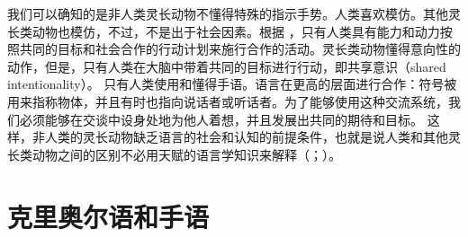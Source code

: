 我们可以确知的是非人类灵长动物不懂得特殊的指示手势。人类喜欢模仿。其他灵长类动物也模仿，不过，不是出于社会因素\citep[--10]{Tomasello2006c}。根据 \citet[]{TCCBM2005a}，只有人类具有能力和动力按照共同的目标和社会合作的行动计划来施行合作的活动。灵长类动物懂得意向性的动作，但是，只有人类在大脑中带着共同的目标进行行动，即共享意识（shared intentionality）。
只有人类使用和懂得手语\citep[, 724, 726]{TCCBM2005a}。语言在更高的层面进行合作：符号被用来指称物体，并且有时也指向说话者或听话者。为了能够使用这种交流系统，我们必须能够在交谈中设身处地为他人着想，并且发展出共同的期待和目标\citep[]{TCCBM2005a}。
这样，非人类的灵长动物缺乏语言的社会和认知的前提条件，也就是说人类和其他灵长类动物之间的区别不必用天赋的语言学知识来解释（\citealp[\S~8.1.2]{Tomasello2003a}；\citealp{TCCBM2005a}）。

\section{克里奥尔语和手语}

